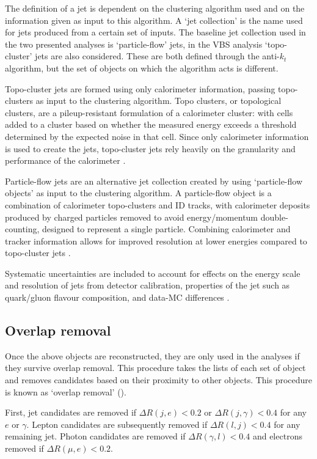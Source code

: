 The definition of a jet is dependent on the clustering algorithm used and on the
information given as input to this algorithm.
A `jet collection' is the name
used for jets produced from a certain set of inputs. The baseline jet collection
used in the two presented analyses is `particle-flow' jets, in the \ac{VBS}
analysis `topo-cluster' jets are also considered. These are both defined through
the anti-$k_t$ algorithm, but the set of objects on which the algorithm acts is
different.

Topo-cluster jets are formed using only calorimeter information, passing
topo-clusters as input to the clustering algorithm. Topo clusters, or
topological clusters, are a pileup-resistant formulation of a calorimeter
cluster: with cells added to a cluster based on whether the measured energy
exceeds a threshold determined by the expected noise in that cell. Since only
calorimeter information is used to create the jets, topo-cluster jets rely
heavily on the granularity and performance of the calorimeter \cite{Aad2017b}.

Particle-flow jets are an alternative jet collection created by using
`particle-flow objects' as input to the clustering algorithm. A particle-flow
object is a combination of calorimeter topo-clusters and \ac{ID} tracks, with
calorimeter deposits produced by charged particles removed to avoid
energy/momentum double-counting, designed to represent a single particle.
Combining calorimeter and tracker information allows for improved resolution at
lower energies compared to topo-cluster jets \cite{Aaboud2017a}.

Systematic uncertainties are included to account for effects on the energy scale
and resolution of jets from detector calibration, properties of the jet such as
quark/gluon flavour composition, and data-\ac{MC} differences
\cite{JESUncerts2017}.

\subsection{Overlap removal}

Once the above objects are reconstructed, they are only used in the analyses if
they survive overlap removal. This procedure takes the lists of each set of
object and removes candidates based on their proximity to other objects. This
procedure is known as `overlap removal' ().

First, jet candidates are removed if $\Delta R(j,e) < 0.2$ or $\Delta
R(j,\gamma) < 0.4$ for any $e$ or $\gamma$. Lepton candidates are subsequently
removed if $\Delta R(l,j) < 0.4$ for any remaining jet. Photon candidates are
removed if $\Delta R(\gamma,l) < 0.4$ and electrons removed if $\Delta R(\mu,e)
< 0.2$.

